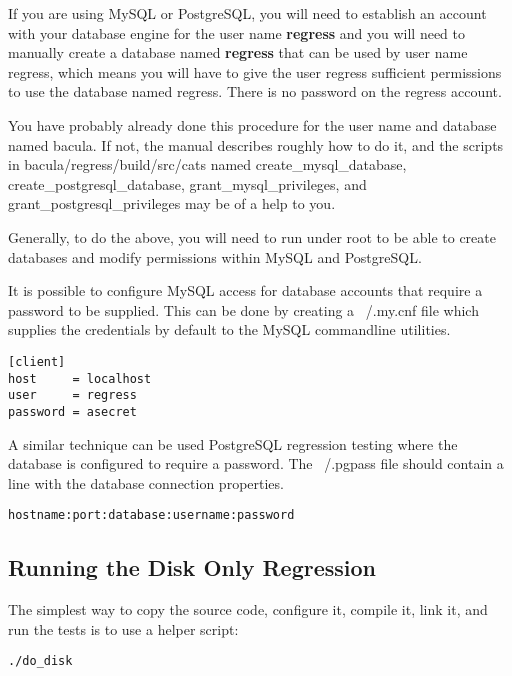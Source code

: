 If you are using MySQL or PostgreSQL, you will need to establish an
account with your database engine for the user name {\bf regress} and
you will need to manually create a database named {\bf regress} that can be
used by user name regress, which means you will have to give the user
regress sufficient permissions to use the database named regress.
There is no password on the regress account.

You have probably already done this procedure for the user name and
database named bacula.  If not, the manual describes roughly how to
do it, and the scripts in bacula/regress/build/src/cats named
create\_mysql\_database, create\_postgresql\_database, grant\_mysql\_privileges,
and grant\_postgresql\_privileges may be of a help to you.

Generally, to do the above, you will need to run under root to 
be able to create databases and modify permissions within MySQL and
PostgreSQL.

It is possible to configure MySQL access for database accounts that
require a password to be supplied. This can be done by creating a ~/.my.cnf
file which supplies the credentials by default to the MySQL commandline
utilities.

\begin{verbatim}
[client]
host     = localhost
user     = regress
password = asecret
\end{verbatim}

A similar technique can be used PostgreSQL regression testing where the
database is configured to require a password. The ~/.pgpass file should
contain a line with the database connection properties.

\begin{verbatim}
hostname:port:database:username:password
\end{verbatim}

\subsection{Running the Disk Only Regression}

The simplest way to copy the source code, configure it, compile it, link
it, and run the tests is to use a helper script:

\footnotesize
\begin{verbatim}
./do_disk
\end{verbatim}
\normalsize




